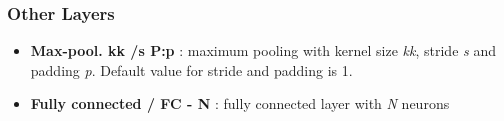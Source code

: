 \subsubsection*{Other Layers}
\begin{itemize}
    \item \textbf{Max-pool. k\x k /s P:p} : maximum pooling with kernel size \textit{k\x k}, stride \textit{s} and padding \textit{p}. Default value for stride and padding is 1.
    
    \item \textbf{Fully connected / FC - N} : fully connected layer with \textit{N} neurons
\end{itemize}